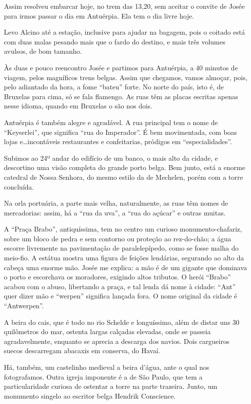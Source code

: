 Assim resolveu embarcar hoje, no trem das 13,20, sem aceitar o convite de Josée para irmos passar o dia em Antuérpia. Ela tem o dia livre hoje.

Levo Alcino até a estação, inclusive para ajudar na bagagem, pois o coitado está com duas malas pesando mais que o fardo do destino, e mais três volumes avulsos, de bom tamanho.

Às duas e pouco reencontro Josée e partimos para Antuérpia, a 40 minutos de viagem, pelos magníficos trens belgas. Assim que chegamos, vamos almoçar, pois, pelo adiantado da hora, a fome “bateu” forte. No norte do país, isto é, de Bruxelas para cima, só se fala flamengo. As ruas têm as placas escritas apenas nesse idioma, quando em Bruxelas o são nos dois.

Antuérpia é também alegre e agradável. A rua principal tem o nome de “Keyserlei”, que significa “rua do Imperador”. É bem movimentada, com boas lojas e\ldots incontáveis restaurantes e confeitarias, pródigos em “especialidades”.

Subimos ao 24º andar do edifício de um banco, o mais alto da cidade, e descortino uma visão completa do grande porto belga. Bem junto, está a enorme catedral de Nossa Senhora, do mesmo estilo da de Mechelen, porém com a torre concluída.

Na orla portuária, a parte mais velha, naturalmente, as ruas têm nomes de mercadorias: assim, há a “rua da uva”, a “rua do açúcar” e outras muitas.

A “Praça Brabo”, antiquíssima, tem no centro um curioso monumento-chafariz, sobre um bloco de pedra e sem contorno ou proteção ao rez-do-chão; a água escorre livremente na pavimentação de paralelepípedo, como se fosse malha do meio-fio. A estátua mostra uma figura de feições lendárias, segurando ao alto da cabeça uma enorme mão. Josée me explica: a mão é de um gigante que dominava o porto e escorchava os moradores, exigindo altos tributos. O herói “Brabo” acabou com o abuso, libertando a praça, e tal lenda dá nome à cidade: “Ant” quer dizer mão e “werpen” significa lançada fora. O nome original da cidade é “Antwerpen”.

A beira do cais, que é todo no rio Schelde e longuíssimo, além de distar uns 30 quilômetros do mar, ostenta largas calçadas elevadas, onde se passeia agradavelmente, enquanto se aprecia a descarga dos navios. Dois cargueiros suecos descarregam abacaxis em conserva, do Havaí.

Há, também, um castelinho medieval a beira d’água, ante o qual nos fotografamos. Outra igreja imponente é a de São Paulo, que tem a particularidade curiosa de ostentar a torre na parte trazeira. Junto, um monumento singelo ao escritor belga Hendrik Conscience.

